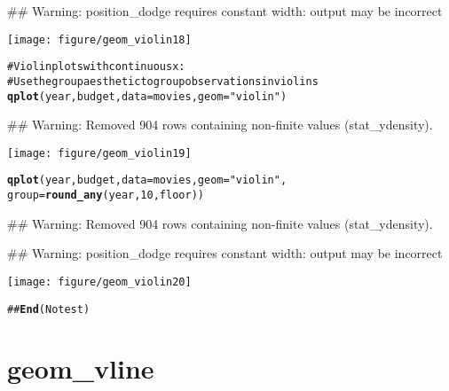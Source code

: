 \documentclass[a4paper,titlepage]{tufte-handout}\usepackage{graphicx, color}
\makeatletter
\def\maxwidth{ %
  \ifdim\Gin@nat@width>\linewidth
    \linewidth
  \else
    \Gin@nat@width
  \fi
}
\newcommand{\hlfunctioncall}[1]{\textcolor[rgb]{0.501960784313725,0,0.329411764705882}{\textbf{#1}}}%
\newcommand{\hlstring}[1]{\textcolor[rgb]{0.6,0.6,1}{#1}}%
\newcommand{\hlcomment}[1]{\textcolor[rgb]{0.180392156862745,0.6,0.341176470588235}{#1}}%
\newenvironment{kframe}{%
 \def\at@end@of@kframe{}%
 \ifinner\ifhmode%
  \def\at@end@of@kframe{\end{minipage}}%
  \begin{minipage}{\columnwidth}%
 \fi\fi%
 \def\FrameCommand##1{\hskip\@totalleftmargin \hskip-\fboxsep
 \colorbox{shadecolor}{##1}\hskip-\fboxsep
     \hskip-\linewidth \hskip-\@totalleftmargin \hskip\columnwidth}%
 \MakeFramed {\advance\hsize-\width
   \@totalleftmargin\z@ \linewidth\hsize
   \@setminipage}}%
 {\par\unskip\endMakeFramed%
 \at@end@of@kframe}
\newenvironment{knitrout}{}{} %
\makeatother
\begin{document}
\begin{knitrout}
\begin{kframe}
\begin{alltt}
\end{alltt}
\begin{flushleft}\ttfamily\noindent\textcolor{warningcolor}{\#\# Warning: position\_dodge requires constant width: output may be incorrect}\end{flushleft}\end{kframe}\texttt{[image: figure/geom\_violin18]} \begin{kframe}\begin{alltt}
\hlcomment{# Violin plots with continuous x:}
\hlcomment{# Use the group aesthetic to group observations in violins}
\hlfunctioncall{qplot}(year, budget, data = movies, geom = \hlstring{"violin"})
\end{alltt}
\begin{flushleft}\ttfamily\noindent\textcolor{warningcolor}{\#\# Warning: Removed 904 rows containing non-finite values (stat\_ydensity).}\end{flushleft}\end{kframe}\texttt{[image: figure/geom\_violin19]} \begin{kframe}\begin{alltt}
\hlfunctioncall{qplot}(year, budget, data = movies, geom = \hlstring{"violin"},
  group = \hlfunctioncall{round_any}(year, 10, floor))
\end{alltt}
\begin{flushleft}\ttfamily\noindent\textcolor{warningcolor}{\#\# Warning: Removed 904 rows containing non-finite values (stat\_ydensity).}\end{flushleft}\begin{flushleft}\ttfamily\noindent\textcolor{warningcolor}{\#\# Warning: position\_dodge requires constant width: output may be incorrect}\end{flushleft}\end{kframe}\texttt{[image: figure/geom\_violin20]} \begin{kframe}\begin{alltt}
\hlcomment{## \hlfunctioncall{End}(No test)}
\end{alltt}
\end{kframe}
\end{knitrout}


\section{geom\_vline}
\end{document}
